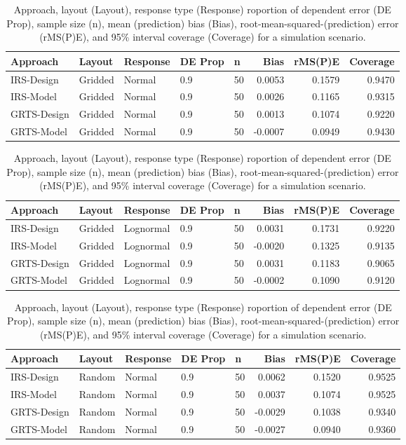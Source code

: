 \documentclass[]{elsarticle} %
\begin{document}
\begin{table}[ht]
\centering
\begin{tabular}{lllllrrr}
  \hline
Approach & Layout & Response & DE Prop & n & Bias & rMS(P)E & Coverage \\ 
  \hline
IRS-Design & Gridded & Normal & 0.9 & 50 & 0.0053 & 0.1579 & 0.9470 \\ 
  IRS-Model & Gridded & Normal & 0.9 & 50 & 0.0026 & 0.1165 & 0.9315 \\ 
  GRTS-Design & Gridded & Normal & 0.9 & 50 & 0.0013 & 0.1074 & 0.9220 \\ 
  GRTS-Model & Gridded & Normal & 0.9 & 50 & -0.0007 & 0.0949 & 0.9430 \\ 
   \hline
\end{tabular}
\caption{Approach, layout (Layout), response type (Response) roportion of dependent error (DE Prop), sample size (n), mean (prediction) bias (Bias), root-mean-squared-(prediction) error (rMS(P)E), and 95\% interval coverage (Coverage) for a simulation scenario.} 
\end{table}
\begin{table}[ht]
\centering
\begin{tabular}{lllllrrr}
  \hline
Approach & Layout & Response & DE Prop & n & Bias & rMS(P)E & Coverage \\ 
  \hline
IRS-Design & Gridded & Lognormal & 0.9 & 50 & 0.0031 & 0.1731 & 0.9220 \\ 
  IRS-Model & Gridded & Lognormal & 0.9 & 50 & -0.0020 & 0.1325 & 0.9135 \\ 
  GRTS-Design & Gridded & Lognormal & 0.9 & 50 & 0.0031 & 0.1183 & 0.9065 \\ 
  GRTS-Model & Gridded & Lognormal & 0.9 & 50 & -0.0002 & 0.1090 & 0.9120 \\ 
   \hline
\end{tabular}
\caption{Approach, layout (Layout), response type (Response) roportion of dependent error (DE Prop), sample size (n), mean (prediction) bias (Bias), root-mean-squared-(prediction) error (rMS(P)E), and 95\% interval coverage (Coverage) for a simulation scenario.} 
\end{table}
\begin{table}[ht]
\centering
\begin{tabular}{lllllrrr}
  \hline
Approach & Layout & Response & DE Prop & n & Bias & rMS(P)E & Coverage \\ 
  \hline
IRS-Design & Random & Normal & 0.9 & 50 & 0.0062 & 0.1520 & 0.9525 \\ 
  IRS-Model & Random & Normal & 0.9 & 50 & 0.0037 & 0.1074 & 0.9525 \\ 
  GRTS-Design & Random & Normal & 0.9 & 50 & -0.0029 & 0.1038 & 0.9340 \\ 
  GRTS-Model & Random & Normal & 0.9 & 50 & -0.0027 & 0.0940 & 0.9360 \\ 
   \hline
\end{tabular}
\caption{Approach, layout (Layout), response type (Response) roportion of dependent error (DE Prop), sample size (n), mean (prediction) bias (Bias), root-mean-squared-(prediction) error (rMS(P)E), and 95\% interval coverage (Coverage) for a simulation scenario.} 
\end{table}
\end{document}
